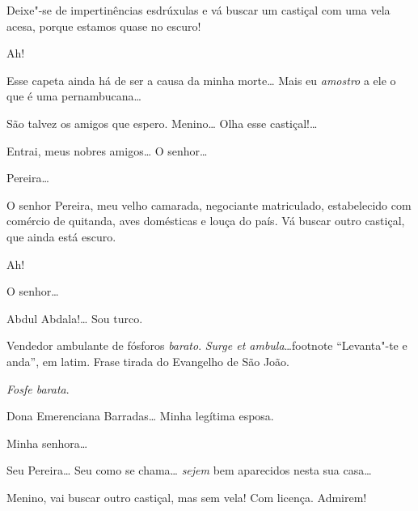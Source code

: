  Deixe"-se de
impertinências esdrúxulas e vá buscar um
castiçal com uma vela acesa, porque estamos quase no
escuro!

  
Ah! 

 Esse capeta ainda há de
ser a causa da minha morte\ldots{} Mais eu \textit{amostro}
a  ele o que é uma pernambucana\ldots{} 

 São talvez os
amigos que espero. 
Menino\ldots{} Olha esse
castiçal!\ldots{} 



 Entrai, meus nobres amigos\ldots{} 
O senhor\ldots{}

 Pereira\ldots{}

 O senhor Pereira, meu velho
camarada, negociante matriculado, estabelecido com comércio
de quitanda, aves domésticas e louça do
país.  Vá buscar outro castiçal,
que ainda está escuro.

 
Ah! 

 
O senhor\ldots{}

 Abdul Abdala!\ldots{} 
Sou turco.

 Vendedor
ambulante de fósforos \textit{barato}. \textit{Surge et
ambula}\ldots{}footnote{
``Levanta"-te e anda'', em latim. Frase tirada do Evangelho de São João.}

 \textit{Fosfe barata}. 

 Dona
Emerenciana Barradas\ldots{} Minha legítima esposa.

 Minha senhora\ldots{}

  
Seu Pereira\ldots{} Seu como se chama\ldots{} \textit{sejem} bem
aparecidos nesta sua casa\ldots{}

 
Menino, vai buscar outro
castiçal, mas sem vela!  Com licença.
Admirem!

